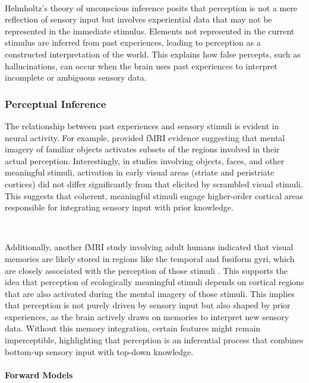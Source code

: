 \documentclass{article}
\begin{document}
\

Helmholtz’s theory of unconscious inference posits that perception is not a mere reflection of sensory input but involves experiential data that may not be represented in the immediate stimulus. \citep{helmholtz1867concerning} Elements not represented in the current stimulus are inferred from past experiences, leading to perception as a constructed interpretation of the world. This explains how false percepts, such as hallucinations, can occur when the brain uses past experiences to interpret incomplete or ambiguous sensory data.


\subsubsection{Perceptual Inference}

The relationship between past experiences and sensory stimuli is evident in neural activity. For example, \citet{ishai2000distributed} provided fMRI evidence suggesting that mental imagery of familiar objects activates subsets of the regions involved in their actual perception. Interestingly, in studies involving objects, faces, and other meaningful stimuli, activation in early visual areas (striate and peristriate cortices) did not differ significantly from that elicited by scrambled visual stimuli. This suggests that coherent, meaningful stimuli engage higher-order cortical areas responsible for integrating sensory input with prior knowledge.

\

Additionally, another fMRI study involving adult humans indicated that visual memories are likely stored in regions like the temporal and fusiform gyri, which are closely associated with the perception of those stimuli \citep{sterpenich2007sleep}. This supports the idea that perception of ecologically meaningful stimuli depends on cortical regions that are also activated during the mental imagery of those stimuli. This implies that perception is not purely driven by sensory input but also shaped by prior experiences, as the brain actively draws on memories to interpret new sensory data. Without this memory integration, certain features might remain imperceptible, highlighting that perception is an inferential process that combines bottom-up sensory input with top-down knowledge.

\paragraph{Forward Models}
\end{document}
